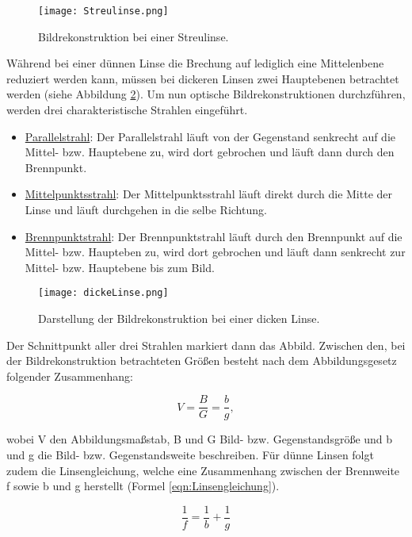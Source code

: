 \begin{figure}
  \centering
  \texttt{[image: Streulinse.png]}
  \caption{Bildrekonstruktion bei einer Streulinse. \cite{anleitung01}}
  \label{fig:Streulinse}
\end{figure}

Während bei einer dünnen Linse die Brechung auf lediglich eine Mittelenbene reduziert
werden kann, müssen bei dickeren Linsen zwei Hauptebenen betrachtet werden (siehe
Abbildung \ref{fig:dickeLinse}). Um nun optische Bildrekonstruktionen durchzführen, werden
drei charakteristische Strahlen eingeführt.

\begin{itemize}
  \item \underline{Parallelstrahl}: Der Parallelstrahl läuft von der Gegenstand
  senkrecht auf die Mittel- bzw. Hauptebene zu, wird dort gebrochen und läuft
  dann durch den Brennpunkt.
  \item \underline{Mittelpunktsstrahl}: Der Mittelpunktsstrahl läuft direkt durch
  die Mitte der Linse und läuft durchgehen in die selbe Richtung.
  \item \underline{Brennpunktstrahl}: Der Brennpunktstrahl läuft durch den Brennpunkt
  auf die Mittel- bzw.  Haupteben zu, wird dort gebrochen und läuft dann senkrecht
  zur Mittel- bzw. Hauptebene bis zum Bild.
\end{itemize}

\begin{figure}
  \centering
  \texttt{[image: dickeLinse.png]}
  \caption{Darstellung der Bildrekonstruktion bei einer dicken Linse.\cite{anleitung01}}
  \label{fig:dickeLinse}
\end{figure}

Der Schnittpunkt aller drei Strahlen markiert dann das Abbild. Zwischen den, bei der
Bildrekonstruktion betrachteten Größen besteht nach dem Abbildungsgesetz folgender
Zusammenhang:

\begin{equation}
  V = \frac{B}{G} = \frac{b}{g},
  \label{eqn:Abbildungsgesetz}
\end{equation}

wobei V den Abbildungsmaßstab, B und G Bild- bzw. Gegenstandsgröße und b und g die
Bild- bzw. Gegenstandsweite beschreiben. Für dünne Linsen folgt zudem die Linsengleichung,
welche eine Zusammenhang zwischen der Brennweite f sowie b und g herstellt (Formel
\eqref{eqn:Linsengleichung}).

\begin{equation}
\frac{1}{f} = \frac{1}{b} + \frac{1}{g}
\label{eqn:Linsengleichung}
\end{equation}


